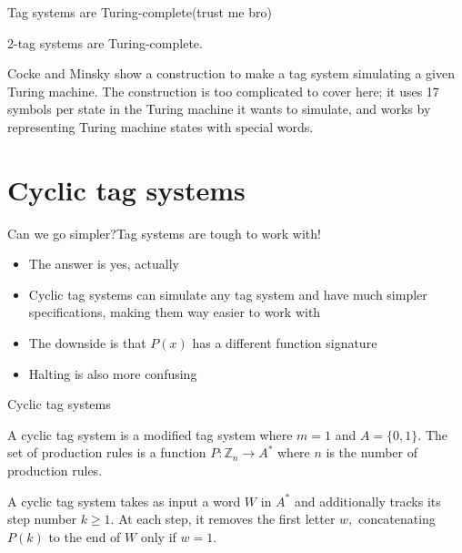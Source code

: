 \documentclass[aspectratio=169]{beamer}
\begin{document}
\begin{frame}{Tag systems are Turing-complete}{(trust me bro)}
\begin{thrm}
    2-tag systems are Turing-complete\cite{10.1145/321203.321206}.
\end{thrm}
\begin{pf}
    Cocke and Minsky show a construction to make a tag system simulating a given Turing machine. The construction is too complicated to cover here; it uses 17 symbols per state in the Turing machine it wants to simulate, and works by representing Turing machine states with special words.
\end{pf}
\end{frame}

\section{Cyclic tag systems}
\frame{\sectionpage}

\begin{frame}{Can we go simpler?}{Tag systems are tough to work with!}
\pause
    \begin{itemize}
        \item The answer is yes, actually \pause
        \item \textcolor{sigma@mainblue}{Cyclic tag systems} can simulate any tag system and have much simpler specifications, making them way easier to work with \pause
        \item The downside is that $P(x)$ has a different function signature \pause
        \item Halting is also more confusing
    \end{itemize}
\end{frame}

\begin{frame}{Cyclic tag systems}
    \begin{defn}
        A \textcolor{sigma@mainblue}{cyclic tag system} is a modified tag system where $m=1$ and $A=\{0, 1\}.$ The set of production rules is a function $P: \mathbb{Z}_n \rightarrow A^*$ where $n$ is the number of production rules.
    \end{defn}
    \pause
    A cyclic tag system takes as input a word $W$ in $A^*$ and additionally tracks its step number $k \geq 1$. At each step, it removes the first letter $w,$  concatenating $P(k)$ to the end of $W$ only if $w=1.$
\end{frame}
\end{document}
